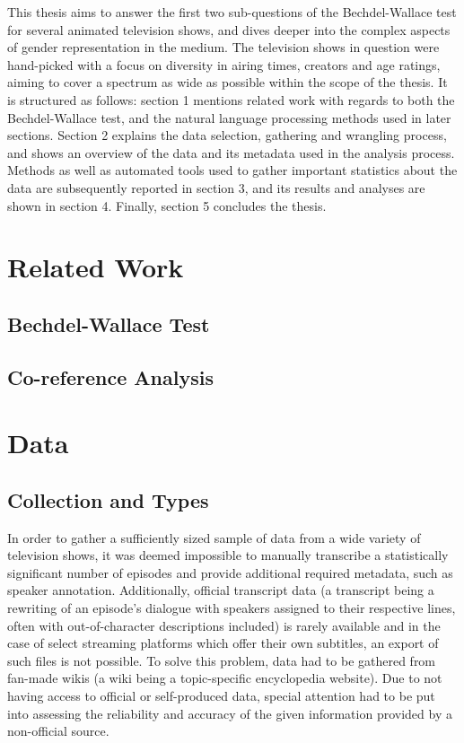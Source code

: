 \documentclass[a4paper, 11pt]{article}
\begin{document}
This thesis aims to answer the first two sub-questions of the Bechdel-Wallace test for several animated television shows, and dives deeper into the complex aspects of gender representation in the medium. The television shows in question were hand-picked with a focus on diversity in airing times, creators and age ratings, aiming to cover a spectrum as wide as possible within the scope of the thesis. It is structured as follows: section 1 mentions related work with regards to both the Bechdel-Wallace test, and the natural language processing methods used in later sections. Section 2 explains the data selection, gathering and wrangling process, and shows an overview of the data and its metadata used in the analysis process. Methods as well as automated tools used to gather important statistics about the data are subsequently reported in section 3, and its results and analyses are shown in section 4. Finally, section 5 concludes the thesis.

\section{Related Work}

\subsection{Bechdel-Wallace Test}

\subsection{Co-reference Analysis}

\section{Data}

\subsection{Collection and Types}
In order to gather a sufficiently sized sample of data from a wide variety of television shows, it was deemed impossible to manually transcribe a statistically significant number of episodes and provide additional required metadata, such as speaker annotation. Additionally, official transcript data (a transcript being a rewriting of an episode's dialogue with speakers assigned to their respective lines, often with out-of-character descriptions included) is rarely available and in the case of select streaming platforms which offer their own subtitles, an export of such files is not possible. To solve this problem, data had to be gathered from fan-made wikis (a wiki being a topic-specific encyclopedia website). Due to not having access to official or self-produced data, special attention had to be put into assessing the reliability and accuracy of the given information provided by a non-official source.
\end{document}
